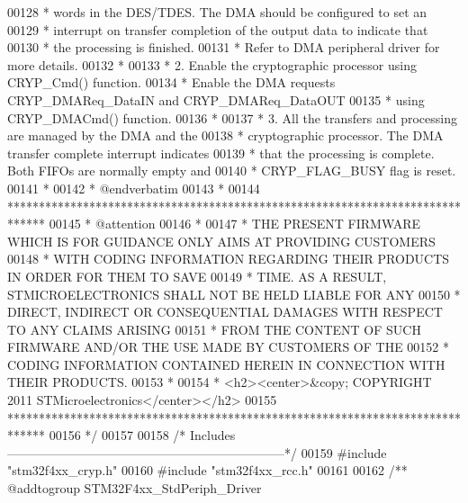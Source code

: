 \begin{DoxyCode}
00128 \textcolor{comment}{  *       words in the DES/TDES. The DMA should be configured to set an }
00129 \textcolor{comment}{  *       interrupt on transfer completion of the output data to indicate that }
00130 \textcolor{comment}{  *       the processing is finished. }
00131 \textcolor{comment}{  *       Refer to DMA peripheral driver for more details.  }
00132 \textcolor{comment}{  *}
00133 \textcolor{comment}{  *    2. Enable the cryptographic processor using CRYP\_Cmd() function. }
00134 \textcolor{comment}{  *       Enable the DMA requests CRYP\_DMAReq\_DataIN and CRYP\_DMAReq\_DataOUT }
00135 \textcolor{comment}{  *       using CRYP\_DMACmd() function.}
00136 \textcolor{comment}{  *}
00137 \textcolor{comment}{  *    3. All the transfers and processing are managed by the DMA and the }
00138 \textcolor{comment}{  *       cryptographic processor. The DMA transfer complete interrupt indicates }
00139 \textcolor{comment}{  *       that the processing is complete. Both FIFOs are normally empty and }
00140 \textcolor{comment}{  *       CRYP\_FLAG\_BUSY flag is reset.}
00141 \textcolor{comment}{  *}
00142 \textcolor{comment}{  *  @endverbatim}
00143 \textcolor{comment}{  *}
00144 \textcolor{comment}{  ******************************************************************************}
00145 \textcolor{comment}{  * @attention}
00146 \textcolor{comment}{  *}
00147 \textcolor{comment}{  * THE PRESENT FIRMWARE WHICH IS FOR GUIDANCE ONLY AIMS AT PROVIDING CUSTOMERS}
00148 \textcolor{comment}{  * WITH CODING INFORMATION REGARDING THEIR PRODUCTS IN ORDER FOR THEM TO SAVE}
00149 \textcolor{comment}{  * TIME. AS A RESULT, STMICROELECTRONICS SHALL NOT BE HELD LIABLE FOR ANY}
00150 \textcolor{comment}{  * DIRECT, INDIRECT OR CONSEQUENTIAL DAMAGES WITH RESPECT TO ANY CLAIMS ARISING}
00151 \textcolor{comment}{  * FROM THE CONTENT OF SUCH FIRMWARE AND/OR THE USE MADE BY CUSTOMERS OF THE}
00152 \textcolor{comment}{  * CODING INFORMATION CONTAINED HEREIN IN CONNECTION WITH THEIR PRODUCTS.}
00153 \textcolor{comment}{  *}
00154 \textcolor{comment}{  * <h2><center>&copy; COPYRIGHT 2011 STMicroelectronics</center></h2>}
00155 \textcolor{comment}{  ******************************************************************************  }
00156 \textcolor{comment}{  */}
00157 
00158 \textcolor{comment}{/* Includes ------------------------------------------------------------------*/}
00159 \textcolor{preprocessor}{#}\textcolor{preprocessor}{include} "stm32f4xx_cryp.h"
00160 \textcolor{preprocessor}{#}\textcolor{preprocessor}{include} "stm32f4xx_rcc.h"
00161 
00162 \textcolor{comment}{/** @addtogroup STM32F4xx\_StdPeriph\_Driver}

\end{DoxyCode}
